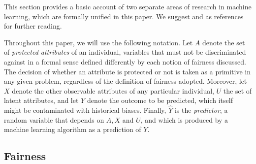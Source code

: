 

This section provides a basic account of two separate areas of
research in machine learning, which are formally unified in this
paper. We suggest \citet{berk:17} and \citet{pearl:16} as references for
further reading.

Throughout this paper, we will use the following notation.  Let $A$
denote the set of {\it protected attributes} of an individual,
variables that must not be discriminated against in a formal sense
defined differently by each notion of fairness discussed. The decision
of whether an attribute is protected or not is taken as a primitive in
any given problem, regardless of the definition of fairness
adopted. Moreover, let $X$ denote the other observable attributes of any
particular individual, $U$ the set of latent attributes, and let $Y$
denote the outcome to be predicted, which itself might be contaminated
with historical biases. Finally, $\hat Y$ is the {\it predictor}, a
random variable that depends on $A, X$ and $U$, and which is produced by
a machine learning algorithm as a prediction of $Y$.

\subsection{Fairness}

